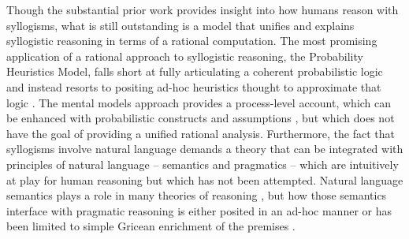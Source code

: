 \documentclass[floatsintext, doc]{apa6}
\begin{document}
Though the substantial prior work provides insight into how humans reason with syllogisms, what is still outstanding is a model that unifies and explains syllogistic reasoning in terms of a rational computation.
The most promising application of a rational approach to syllogistic reasoning, the Probability Heuristics Model, falls short at fully articulating a coherent probabilistic logic and instead resorts to positing ad-hoc heuristics thought to approximate that logic \cite{Chater1999}.
The mental models approach provides a process-level account, which can be enhanced with probabilistic constructs and assumptions \cite{johnson2015logic}, but which does not have the goal of providing a unified rational analysis. 
%
%
Furthermore, the fact that syllogisms involve natural language demands a theory that can be integrated with principles of natural language -- semantics and pragmatics -- which are intuitively at play for human reasoning \cite{sperber1986relevance,mercier2017enigma} but which has not been attempted.
Natural language semantics plays a role in many theories of reasoning \cite{JL1978, Khemlani2012, geurts2003reasoning}, but how those semantics interface with pragmatic reasoning is either posited in an ad-hoc manner \cite{Chater1999} or has been limited to simple Gricean enrichment of the premises \cite{Roberts2001}.	

\end{document}
